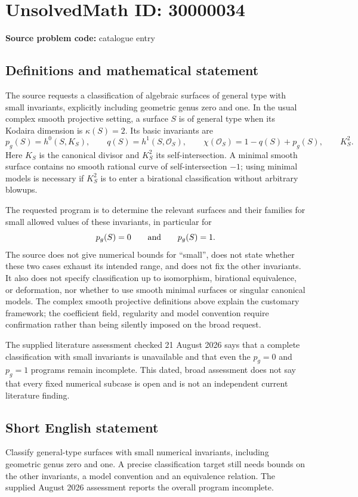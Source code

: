 \documentclass[11pt]{article}
\begin{document}
\section*{UnsolvedMath ID: 30000034}
\textbf{Source problem code:} catalogue entry
\subsection{Definitions and mathematical statement}
The source requests a classification of algebraic surfaces of general type with small invariants, explicitly including geometric genus zero and one. In the usual complex smooth projective setting, a surface $S$ is of general type when its Kodaira dimension is $\kappa(S)=2$. Its basic invariants are
\[
 p_g(S)=h^0(S,K_S),\qquad q(S)=h^1(S,\mathcal O_S),\qquad
 \chi(\mathcal O_S)=1-q(S)+p_g(S),\qquad K_S^2.
\]
Here $K_S$ is the canonical divisor and $K_S^2$ its self-intersection. A minimal smooth surface contains no smooth rational curve of self-intersection $-1$; using minimal models is necessary if $K_S^2$ is to enter a birational classification without arbitrary blowups.

The requested program is to determine the relevant surfaces and their families for small allowed values of these invariants, in particular for
\[
 p_g(S)=0\qquad\hbox{and}\qquad p_g(S)=1.
\]
The source does not give numerical bounds for ``small'', does not state whether these two cases exhaust its intended range, and does not fix the other invariants. It also does not specify classification up to isomorphism, birational equivalence, or deformation, nor whether to use smooth minimal surfaces or singular canonical models. The complex smooth projective definitions above explain the customary framework; the coefficient field, regularity and model convention require confirmation rather than being silently imposed on the broad request.

The supplied literature assessment checked 21 August 2026 says that a complete classification with small invariants is unavailable and that even the $p_g=0$ and $p_g=1$ programs remain incomplete. This dated, broad assessment does not say that every fixed numerical subcase is open and is not an independent current literature finding.
\subsection{Short English statement}
Classify general-type surfaces with small numerical invariants, including geometric genus zero and one. A precise classification target still needs bounds on the other invariants, a model convention and an equivalence relation. The supplied August 2026 assessment reports the overall program incomplete.
\end{document}

